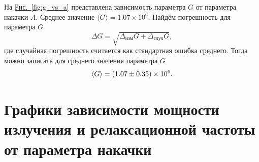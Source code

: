 \documentclass[12pt]{article}
\newcommand*{\figref}[2][]{\hyperref[#2]{Рис.~\ref*{#2}#1}}
\begin{document}
	На \figref{fig:g_vs_a} представлена зависимость параметра $G$ от параметра накачки $A$. Среднее значение $\langle G \rangle = 1.07\times10^{6}$. Найдём погрешность для параметра $G$
	\begin{equation}
		\Delta G = \sqrt{\Delta_\text{изм} G + \Delta_\text{случ}G},
	\end{equation}
	где случайная погрешность считается как стандартная ошибка среднего. Тогда можно записать для среднего значения параметра $G$
	\begin{equation}
		\langle G \rangle = \qty(1.07\pm0.35)\times10^{6}.
	\end{equation}

	\section{Графики зависимости мощности излучения и релаксационной частоты от параметра накачки}

	
\end{document}
